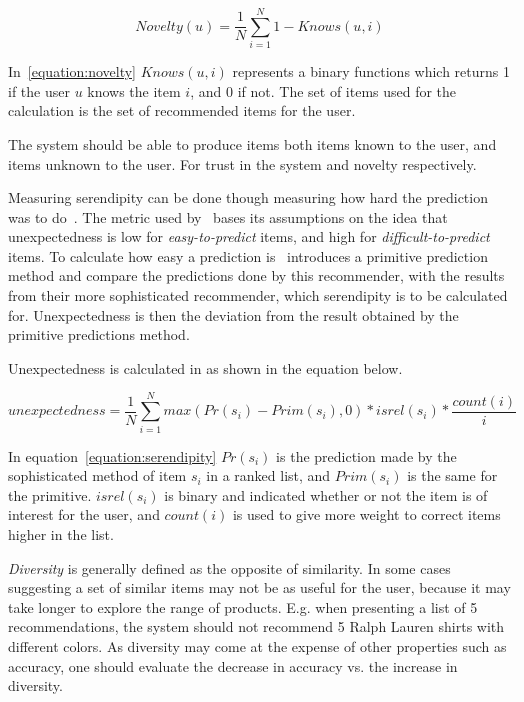 \begin{equation}
    Novelty(u) = \frac{1}{N}\sum_{i=1}^{N}{1 - Knows(u,i)}
    \label{equation:novelty}
\end{equation}

In~\ref{equation:novelty} $Knows(u,i)$ represents a binary functions which
returns 1 if the user $u$ knows the item $i$, and 0 if not.  The set of items
used for the calculation is the set of recommended items for the user.

The system should be able to produce items both items known to the user, and
items unknown to the user.  For trust in the system and novelty respectively.

Measuring serendipity can be done though measuring how hard the prediction was
to do~\cite{serendipity}.  The metric used by~\cite{serendipity} bases its
assumptions on the idea that unexpectedness is low for \emph{easy-to-predict}
items, and high for \emph{difficult-to-predict} items.  To calculate how easy a
prediction is~\cite{serendipity} introduces a primitive prediction method and
compare the predictions done by this recommender, with the results from their
more sophisticated recommender, which serendipity is to be calculated for.
Unexpectedness is then the deviation from the result obtained by the primitive
predictions method.

Unexpectedness is calculated in as shown in the equation below.

\begin{equation}
    unexpectedness = \frac{1}{N}\sum_{i=1}^{N}{max(Pr(s_i) - Prim(s_i),0) * isrel(s_i) * \frac{count(i)}{i}}
    \label{equation:serendipity}
\end{equation}

In equation~\ref{equation:serendipity} $Pr(s_i)$ is the prediction made by the
sophisticated method of item $s_i$ in a ranked list, and $Prim(s_i)$ is the
same for the primitive.  $isrel(s_i)$ is binary and indicated whether or not
the item is of interest for the user, and $count(i)$ is used to give more
weight to correct items higher in the list.

\textit{Diversity} is generally defined as the opposite of similarity. In some
cases suggesting a set of similar items may not be as useful for the user,
because it may take longer to explore the range of products. E.g. when
presenting a list of 5 recommendations, the system should not recommend 5 Ralph
Lauren shirts with different colors. As diversity may come at the expense of
other properties such as accuracy, one should evaluate the decrease in accuracy
vs. the increase in diversity.

